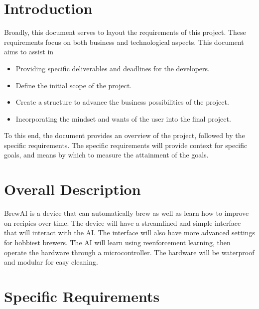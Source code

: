 \documentclass[draftclsnofoot,onecolumn,letterpaper,10pt]{article}
\begin{document}
\section{Introduction}
Broadly, this document serves to layout the requirements of this project.
These requirements focus on both business and technological aspects.
This document aims to assist in
\begin{itemize}
	\item Providing specific deliverables and deadlines for the developers.
	\item Define the initial scope of the project.
	\item Create a structure to advance the business possibilities of the project.
	\item Incorporating the mindset and wants of the user into the final project.
\end{itemize}
To this end, the document provides an overview of the project, followed by the specific requirements.
The specific requirements will provide context for specific goals, and means by which to measure the attainment of the goals.

\section{Overall Description}
BrewAI is a device that can automatically brew as well as learn how to improve on recipies over time.
The device will have a streamlined and simple interface that will interact with the AI.
The interface will also have more advanced settings for hobbiest brewers.
The AI will learn using reenforcement learning, then operate the hardware through a microcontroller.
The hardware will be waterproof and modular for easy cleaning.

\section{Specific Requirements}
\end{document}
